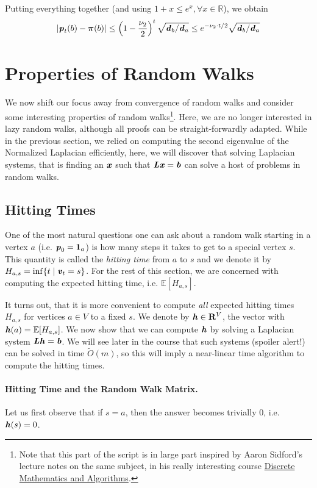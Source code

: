 Putting everything together (and using $1+x \leq e^x, \forall x \in \mathbb{R}$), we obtain 
\[  
    |\boldsymbol{\mathit{p}}_t(b) - \boldsymbol{\pi}(b)| \leq \left(1-\frac{\nu_2}{2}\right)^t \sqrt{\boldsymbol{\mathit{d}}_b/\boldsymbol{\mathit{d}}_a} \leq e^{-\nu_2 \cdot t/2} \sqrt{\boldsymbol{\mathit{d}}_b/\boldsymbol{\mathit{d}}_a} 
\]

\section{Properties of Random Walks}

We now shift our focus away from convergence of random walks and consider some interesting properties of random walks\footnote{Note that this part of the script is in large part inspired by Aaron Sidford's lecture notes on the same subject, in his really interesting course
\href{https://web.stanford.edu/class/cme305/}{Discrete Mathematics and Algorithms}.}. Here, we are no longer interested in lazy random walks, although all proofs can be straight-forwardly adapted. While in the previous section, we relied on computing the second eigenvalue of the Normalized Laplacian efficiently, here, we will discover that solving Laplacian systems, that is finding an $\boldsymbol{\mathit{x}}$ such that $\boldsymbol{\mathit{L}}\boldsymbol{\mathit{x}} = \boldsymbol{\mathit{b}}$ can solve a host of problems in random walks.

\subsection{Hitting Times}

One of the most natural questions one can ask about a random walk starting in a vertex $a$ (i.e. $\boldsymbol{\mathit{p}}_0 = \boldsymbol{1}_a$) is how many steps it takes to get to a special vertex $s$. This quantity is called the \emph{hitting time} from $a$ to $s$ and we denote it by $H_{a,s} = \inf \{ t \;|\; \boldsymbol{\mathit{v}}_t = s \}$. For the rest of this section, we are concerned with computing the expected hitting time, i.e. $\mathbb{E}[H_{a,s}]$.

It turns out, that it is more convenient to compute \emph{all} expected hitting times $H_{a,s}$ for vertices $a \in V$ to a fixed $s$. We denote by ${\boldsymbol{\mathit{h}}} \in \mathbf{R}^V$, the vector with ${\boldsymbol{\mathit{h}}}(a) = \mathbb{E}[H_{a,s}]$. We now show that we can compute ${\boldsymbol{\mathit{h}}}$ by solving a Laplacian system $\boldsymbol{\mathit{L}} {\boldsymbol{\mathit{h}}} = \boldsymbol{\mathit{b}}$. We will see later in the course that such systems (spoiler alert!) can be solved in time $\tilde{O}(m)$, so this will imply a near-linear time algorithm to compute the hitting times.

\paragraph{Hitting Time and the Random Walk Matrix.} Let us first observe that if $s = a$, then the answer becomes trivially $0$, i.e. ${\boldsymbol{\mathit{h}}}(s) = 0$. 

